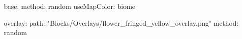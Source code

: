 base:
  method: random
  useMapColor: biome
  
overlay:
  path: "Blocks/Overlays/flower_fringed_yellow_overlay.png"
  method: random